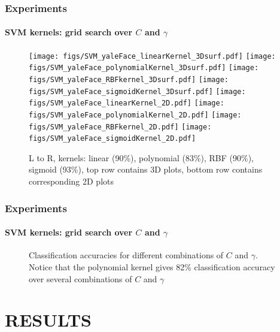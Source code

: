 \begin{frame}[plain]
\frametitle{Experiments}
\framesubtitle{SVM kernels: grid search over $C$ and $\gamma$}
\mypagenum
	\begin{changemargin}{-1.3in}{0in}
		\begin{figure}
			\centering
			\subfigure
			{
				\texttt{[image: figs/SVM\_yaleFace\_linearKernel\_3Dsurf.pdf]}
			}
			\subfigure
			{
				\texttt{[image: figs/SVM\_yaleFace\_polynomialKernel\_3Dsurf.pdf]}
			}
			\subfigure
			{
				\texttt{[image: figs/SVM\_yaleFace\_RBFkernel\_3Dsurf.pdf]}
			}
			\subfigure
			{
				\texttt{[image: figs/SVM\_yaleFace\_sigmoidKernel\_3Dsurf.pdf]}
			}
			\subfigure
			{
				\texttt{[image: figs/SVM\_yaleFace\_linearKernel\_2D.pdf]}
			}
			\subfigure
			{
				\texttt{[image: figs/SVM\_yaleFace\_polynomialKernel\_2D.pdf]}
			}
			\subfigure
			{
				\texttt{[image: figs/SVM\_yaleFace\_RBFkernel\_2D.pdf]}
			}	
			\subfigure
			{
				\texttt{[image: figs/SVM\_yaleFace\_sigmoidKernel\_2D.pdf]}
			}	
			\caption{L to R, kernels: linear (90\%), polynomial (83\%), RBF (90\%), sigmoid (93\%), top row contains 3D plots, bottom row contains corresponding 2D plots}
		\end{figure}
	\end{changemargin}
\end{frame}


\begin{frame}
\frametitle{Experiments}
\framesubtitle{SVM kernels: grid search over $C$ and $\gamma$}
\mypagenum
	\begin{figure}
		\centering
		\caption{\tiny Classification accuracies for different combinations of $C$ and $\gamma$.  Notice that the polynomial kernel gives 82\% classification accuracy over several combinations of $C$ and $\gamma$}
	\end{figure}
\end{frame}



\section{RESULTS}
